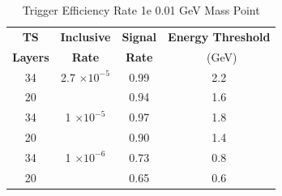 \begin{table}
 \centering
\caption{Trigger Efficiency Rate 1e 0.01 GeV Mass Point}
\begin{tabular}{ c | c | c | c }
\textbf{TS} & \textbf{Inclusive} & \textbf{Signal} & \textbf{Energy Threshold}  \\ \textbf{Layers} & \textbf{Rate} & \textbf{Rate} & \ (GeV) \\ 
\hline
34 & 2.7 $\times 10^{-5}$ & 0.99 & 2.2 \\ 
20 & & 0.94 & 1.6 \\ 
\hline 
34 & 1 $\times 10^{-5}$ & 0.97 & 1.8 \\ 
20 & & 0.90 & 1.4 \\ 
\hline 
34 & 1 $\times 10^{-6}$ & 0.73 & 0.8 \\ 
20 & & 0.65 & 0.6 \\ 
\hline 
\end{tabular}
\end{table}
